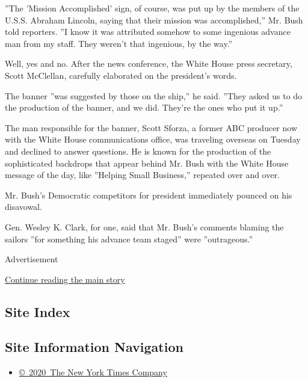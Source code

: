 ''The 'Mission Accomplished' sign, of course, was put up by the members
of the U.S.S. Abraham Lincoln, saying that their mission was
accomplished,'' Mr. Bush told reporters. ''I know it was attributed
somehow to some ingenious advance man from my staff. They weren't that
ingenious, by the way.''

Well, yes and no. After the news conference, the White House press
secretary, Scott McClellan, carefully elaborated on the president's
words.

The banner ''was suggested by those on the ship,'' he said. ''They asked
us to do the production of the banner, and we did. They're the ones who
put it up.''

The man responsible for the banner, Scott Sforza, a former ABC producer
now with the White House communications office, was traveling overseas
on Tuesday and declined to answer questions. He is known for the
production of the sophisticated backdrops that appear behind Mr. Bush
with the White House message of the day, like ''Helping Small
Business,'' repeated over and over.

Mr. Bush's Democratic competitors for president immediately pounced on
his disavowal.

Gen. Wesley K. Clark, for one, said that Mr. Bush's comments blaming the
sailors ''for something his advance team staged'' were ''outrageous.''

Advertisement

\protect\hyperlink{after-bottom}{Continue reading the main story}

\hypertarget{site-index}{%
\subsection{Site Index}\label{site-index}}

\hypertarget{site-information-navigation}{%
\subsection{Site Information
Navigation}\label{site-information-navigation}}

\begin{itemize}
\tightlist
\item
  \href{https://help.nytimes.com/hc/en-us/articles/115014792127-Copyright-notice}{©~2020~The
  New York Times Company}
\end{itemize}


